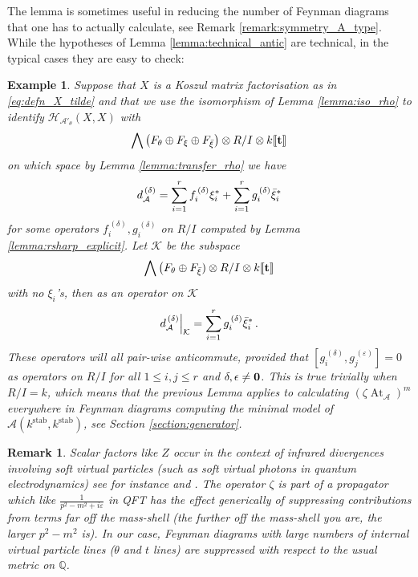 \documentclass[english,letter paper,12pt,leqno]{article}
\theoremstyle{example}
\newtheorem{example}[theorem]{Example}
\newtheorem{remark}[theorem]{Remark}
\numberwithin{equation}{section}
\def\AA{\mathcal{A}}
\def\HH{\HH}
\def\HH{\mathcal{H}}
\def\KK{\mathcal{K}}
\def\stab{\operatorname{stab}}
\DeclareMathOperator{\vAt}{At}
\begin{document}
The lemma is sometimes useful in reducing the number of Feynman diagrams that one has to actually calculate, see Remark \ref{remark:symmetry_A_type}. While the hypotheses of Lemma \ref{lemma:technical_antic} are technical, in the typical cases they are easy to check:

\begin{example}\label{example:computing_min_kstab} Suppose that $X$ is a Koszul matrix factorisation as in \eqref{eq:defn_X_tilde} and that we use the isomorphism of Lemma \ref{lemma:iso_rho} to identify $\HH_{\AA'_\theta}(X,X)$ with
\[
\bigwedge \big( F_\theta \oplus F_\xi \oplus F_{\Bar{\xi}} \big) \otimes R/I \otimes k\llbracket \bold{t} \rrbracket
\]
on which space by Lemma \ref{lemma:transfer_rho} we have
\[
d_{\AA}^{\,(\delta)} = \sum_{i=1}^r f_i^{\,(\delta)} \xi_i^* + \sum_{i=1}^r g_i^{\,(\delta)} \Bar{\xi}_i^*
\]
for some operators $f_i^{\,(\delta)},g_i^{\,(\delta)}$ on $R/I$ computed by Lemma \ref{lemma:rsharp_explicit}. Let $\KK$ be the subspace
\[
\bigwedge \big( F_\theta \oplus F_{\Bar{\xi}} ) \otimes R/I \otimes k\llbracket \bold{t} \rrbracket
\]
with no $\xi_i$'s, then as an operator on $\KK$
\[
d_{\AA}^{\,(\delta)}\Big|_{\KK} = \sum_{i=1}^r g_i^{\,(\delta)} \Bar{\xi}_i^*\,.
\]
These operators will all pair-wise anticommute, provided that $[ g_i^{\,(\delta)}, g_j^{\,(\varepsilon)}] = 0$ as operators on $R/I$ for all $1 \le i,j \le r$ and $\delta, \epsilon \neq \bold{0}$. This is true trivially when $R/I = k$, which means that the previous Lemma applies to calculating $(\zeta \vAt_{\AA})^m$ everywhere in Feynman diagrams computing the minimal model of $\AA(k^{\stab},k^{\stab})$, see Section \ref{section:generator}.
\end{example}

\begin{remark} Scalar factors like $Z$ occur in the context of infrared divergences involving soft virtual particles (such as soft virtual photons in quantum electrodynamics) see for instance \cite[Ch. 13]{weinberg} and \cite[p.204]{ps}. The operator $\zeta$ is part of a propagator \cite[\S 4.1.3]{lazaroiu_sft} which like $\frac{1}{p^2 - m^2 + i \varepsilon}$ in QFT has the effect generically of suppressing contributions from terms far off the mass-shell (the further off the mass-shell you are, the larger $p^2-m^2$ is). In our case, Feynman diagrams with large numbers of internal virtual particle lines ($\theta$ and $t$ lines) are suppressed with respect to the usual metric on $\mathbb{Q}$. 
\end{remark}
\end{document}
